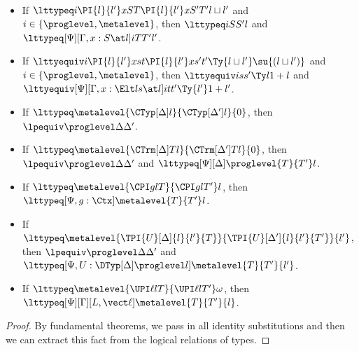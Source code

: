 \begin{lemma} $ $
  \begin{itemize}
  \item If $\lttypeq i{\PI{l}{l'} x S T}{\PI{l}{l'} x{S'}{T'}}{l \sqcup l'}$ and
    $i \in \{\proglevel, \metalevel\}$, then $\lttypeq i{S}{S'}l$ and
    $\lttypeq[\Psi][\Gamma, x : S \at l]i{T}{T'}{l'}$.
  \item If
    $\lttyequiv i{\PI{l}{l'} x s t}{\PI{l}{l'} x{s'}{t'}}{\Ty{l \sqcup l'}}{\su{(l
        \sqcup l')}}$ and $i \in \{\proglevel, \metalevel\}$, then \break
    $\lttyequiv i{s}{s'}{\Ty l}{1 + l}$ and
    $\lttyequiv[\Psi][\Gamma, x : \Elt l s \at l]i{t}{t'}{\Ty{l'}}{1 + l'}$.
  \item If $\lttypeq \metalevel{\CTyp[\Delta]l}{\CTyp[\Delta']l}{0}$, then
    $\lpequiv \proglevel \Delta{\Delta'}$.
  \item If $\lttypeq \metalevel{\CTrm[\Delta] T l}{\CTrm[\Delta'] T l}{0}$, then
    $\lpequiv \proglevel \Delta{\Delta'}$ and $\lttypeq[\Psi][\Delta] \proglevel{T}{T'}l$.
  \item If $\lttypeq \metalevel{\CPI g l T}{\CPI g l{T'}}l$, then
    $\lttypeq[\Psi, g : \Ctx] \metalevel{T}{T'}l$.
  \item If
    $\lttypeq \metalevel{\TPI{U}[\Delta]{l}{l'}{T}}{\TPI{U}[\Delta']{l}{l'}{T'}}{l'}$, then $\lpequiv \proglevel \Delta{\Delta'}$ and
    $\lttypeq[\Psi, U : \DTyp[\Delta] \proglevel l] \metalevel{T}{T'}{l'}$.
  \item If $\lttypeq \metalevel{\UPI \ell l T}{\UPI \ell l{T'}}\omega$, then
    $\lttypeq[\Psi][\Gamma][L, \vect \ell] \metalevel{T}{T'}{l}$.
  \end{itemize}
\end{lemma}
\begin{proof}
  By fundamental theorems, we pass in all identity substitutions and then we can
  extract this fact from the logical relations of types. 
\end{proof}


